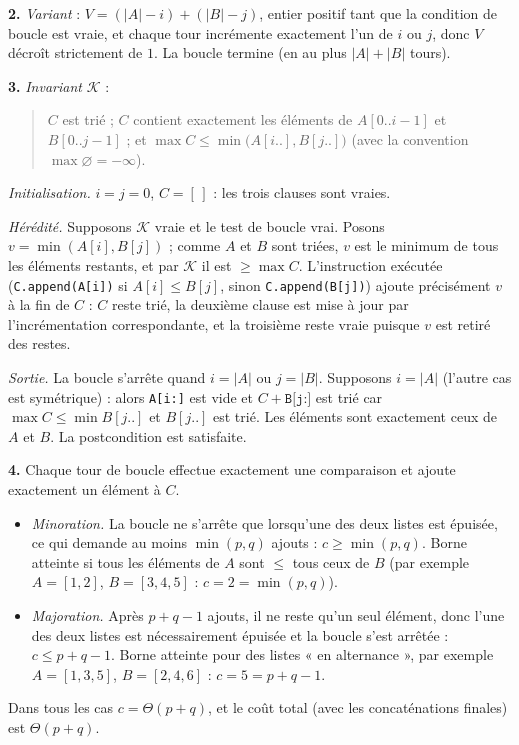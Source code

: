 \documentclass[11pt,a4paper]{article}
\begin{document}
\textbf{2.} \emph{Variant} : $V=(|A|-i)+(|B|-j)$, entier positif tant que la condition
de boucle est vraie, et chaque tour incrémente exactement l'un de $i$ ou $j$, donc $V$
décroît strictement de $1$. La boucle termine (en au plus $|A|+|B|$ tours).

\textbf{3.} \emph{Invariant} $\mathcal K$ :
\begin{quote}
$C$ est trié ; $C$ contient exactement les éléments de $A[0..i-1]$ et $B[0..j-1]$ ;
et $\max C \le \min\big(A[i..],B[j..]\big)$ (avec la convention $\max\varnothing=-\infty$).
\end{quote}

\emph{Initialisation.} $i=j=0$, $C=[\,]$ : les trois clauses sont vraies. \checkmark

\emph{Hérédité.} Supposons $\mathcal K$ vraie et le test de boucle vrai. Posons
$v=\min(A[i],B[j])$ ; comme $A$ et $B$ sont triées, $v$ est le minimum de tous les
éléments restants, et par $\mathcal K$ il est $\ge\max C$. L'instruction exécutée
(\texttt{C.append(A[i])} si $A[i]\le B[j]$, sinon \texttt{C.append(B[j])}) ajoute
précisément $v$ à la fin de $C$ : $C$ reste trié, la deuxième clause est mise à jour par
l'incrémentation correspondante, et la troisième reste vraie puisque $v$ est retiré des
restes. \checkmark

\emph{Sortie.} La boucle s'arrête quand $i=|A|$ ou $j=|B|$. Supposons $i=|A|$ (l'autre
cas est symétrique) : alors \texttt{A[i:]} est vide et $C + \texttt{B[j:]}$ est trié car
$\max C\le\min B[j..]$ et $B[j..]$ est trié. Les éléments sont exactement ceux de $A$ et
$B$. La postcondition est satisfaite. \checkmark

\textbf{4.} Chaque tour de boucle effectue exactement une comparaison et ajoute
exactement un élément à $C$.
\begin{itemize}[leftmargin=*,itemsep=1pt]
  \item \emph{Minoration.} La boucle ne s'arrête que lorsqu'une des deux listes est
        épuisée, ce qui demande au moins $\min(p,q)$ ajouts : $c\ge\min(p,q)$.
        Borne atteinte si tous les éléments de $A$ sont $\le$ tous ceux de $B$
        (par exemple $A=[1,2]$, $B=[3,4,5]$ : $c=2=\min(p,q)$).
  \item \emph{Majoration.} Après $p+q-1$ ajouts, il ne reste qu'un seul élément, donc
        l'une des deux listes est nécessairement épuisée et la boucle s'est arrêtée :
        $c\le p+q-1$. Borne atteinte pour des listes « en alternance », par exemple
        $A=[1,3,5]$, $B=[2,4,6]$ : $c=5=p+q-1$.
\end{itemize}
Dans tous les cas $c=\Theta(p+q)$, et le coût total (avec les concaténations finales)
est $\Theta(p+q)$.
\end{document}
